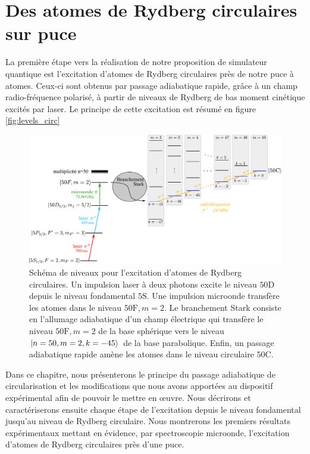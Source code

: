 \chapter{Des atomes de Rydberg circulaires sur puce}
\label{chapter:50c}
\vfill
\minitoc
\newpage

\noindent La première étape vers la réalisation de notre proposition de simulateur quantique est l'excitation d'atomes de Rydberg circulaires près de notre puce à atomes.
Ceux-ci sont obtenus par passage adiabatique rapide, grâce à un champ radio-fréquence polarisé,  à partir de niveaux de Rydberg de bas moment cinétique excités par laser.
Le principe de cette excitation est résumé en figure \eqref{fig:levels_circ}

\begin{figure}[h]
\centering
\includegraphics[width=\linewidth]{figures/circulars/level_scheme_5S50C}
\caption[Schéma de niveaux pour l'excitation d'atomes de Rydberg circulaires]
{Schéma de niveaux pour l'excitation d'atomes de Rydberg circulaires.
Un impulsion laser à deux photons excite le niveau $\mathrm{50D}$ depuis le niveau fondamental $\mathrm{5S}$.
Une impulsion microonde transfère les atomes dans le niveau $\mathrm{50F},m=2$.
Le branchement Stark consiste en l'allumage adiabatique d'un champ électrique qui transfère le niveau $\mathrm{50F},m=2$ de la base sphérique vers le niveau $\ket{n=50,m=2,k=-45}$ de la base parabolique.
Enfin, un passage adiabatique rapide amène les atomes dans le niveau circulaire $\mathrm{50C}$.
}\label{fig:levels_circ}
\end{figure}

Dans ce chapitre, nous présenterons le principe du passage adiabatique de circularisation et les modifications que nous avons apportées au dispositif expérimental afin de pouvoir le mettre en \oe uvre.
Nous décrirons et caractériserons ensuite chaque étape de l'excitation depuis le niveau fondamental jusqu'au niveau de Rydberg circulaire.
Nous montrerons les premiers résultats expérimentaux mettant en évidence, par spectroscopie microonde, l'excitation d'atomes de Rydberg circulaires près d'une puce.

